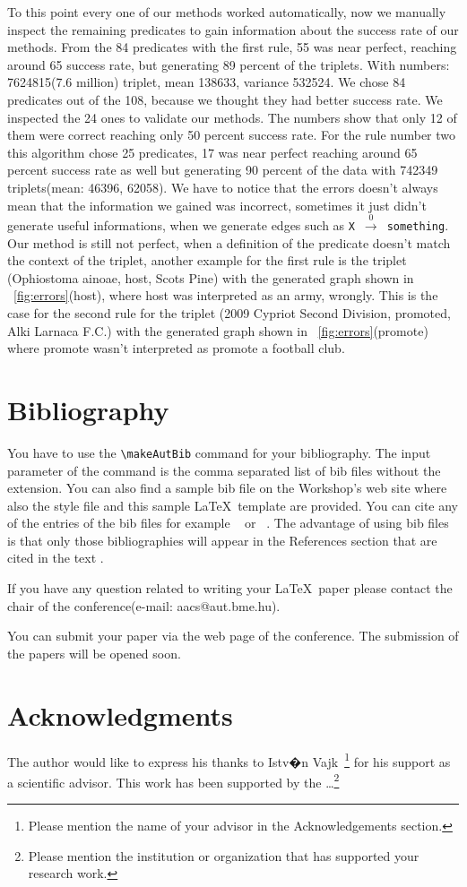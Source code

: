 \documentclass[twoside,b5paper,10pt]{article}
\begin{document}
To this point every one of our methods worked automatically,
now we manually inspect the remaining predicates to gain information about the success rate of our methods. From the 84 predicates with the first rule, 55 was near perfect, reaching around 65 success rate,
but generating 89 percent of the triplets. With numbers: 7624815(7.6 million) triplet, mean 138633, variance 532524. We chose 84 predicates out of the 108, because we thought they had better
success rate. We inspected the 24 ones to validate our methods. The numbers show that only 12 of them were correct reaching only 50 percent success rate.
For the rule number two this algorithm chose 25 predicates, 17 was near perfect reaching around 65 percent success rate as well but generating 90 percent of the data with
742349 triplets(mean: 46396, 62058).
We have to notice that the errors doesn't always mean that the information we gained was incorrect, sometimes it just didn't generate useful informations, when we generate edges such as
\texttt{X}~$\xrightarrow0$~\texttt{something}. 
Our method is still not perfect, when a definition of the predicate doesn't match the context of the triplet, another example for the first rule is the triplet (Ophiostoma ainoae, host, Scots Pine)
with the generated graph shown in \figurename~\ref{fig:errors}(host), where host was interpreted as an army, wrongly. This is the case for the second rule for the triplet (2009 Cypriot Second Division, promoted, Alki Larnaca F.C.)
with the generated graph shown in \figurename~\ref{fig:errors}(promote) where promote wasn't interpreted as promote a football club.

\section{Bibliography}
\label{sec:bib}
You have to use the \verb|\makeAutBib| command for your
bibliography. The input parameter of the command is the comma
separated list of bib files without the extension. You can also find
a sample bib file on the Workshop's web site where also the style
file and this sample \LaTeX \ template are provided. You can cite
any of the entries of the bib files for example ~\cite{ han00mining}
or ~\cite{burdick01mafia}. The advantage of using bib files is that
only those bibliographies will appear in the References section that
are cited in the text \cite{proba}.

If you have any question related to writing your \LaTeX \ paper
please contact the chair of the conference(e-mail: aacs@aut.bme.hu).

You can submit your paper via the web page of the conference. The
submission of the papers will be opened soon.

\section*{Acknowledgments}
 { \small The author would like to express his thanks to Istv�n Vajk~\footnote{Please mention the name of your advisor in the
Acknowledgements section. } for his support as a scientific advisor.
This work has been supported by the \dots \footnote{Please mention
the institution or organization that has supported your research
work.} }

\end{document}
